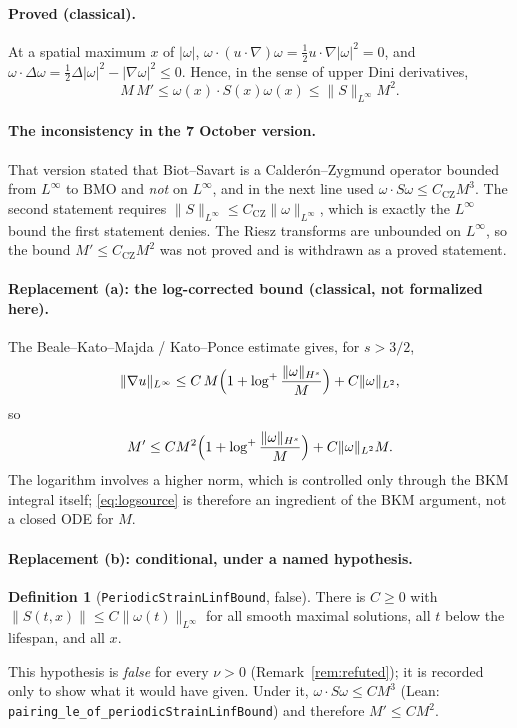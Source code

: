 \documentclass[11pt]{article}
\theoremstyle{definition}
\newtheorem{definition}{Definition}
\theoremstyle{remark}
\begin{document}
\paragraph{Proved (classical).} At a spatial maximum $x$ of $|\omega|$, $\omega\cdot(u\cdot\nabla)\omega=\tfrac12u\cdot\nabla|\omega|^2=0$, and $\omega\cdot\Delta\omega=\tfrac12\Delta|\omega|^2-|\nabla\omega|^2\le0$. Hence, in the sense of upper Dini derivatives,
\begin{equation}\label{eq:pairing}
M\,M'\le \omega(x)\cdot S(x)\omega(x)\le \|S\|_{L^\infty}M^2 .
\end{equation}

\paragraph{The inconsistency in the 7 October version.} That version stated that Biot--Savart is a Calder\'on--Zygmund operator bounded from $L^\infty$ to $\mathrm{BMO}$ and \emph{not} on $L^\infty$, and in the next line used $\omega\cdot S\omega\le C_{\mathrm{CZ}}M^3$. The second statement requires $\|S\|_{L^\infty}\le C_{\mathrm{CZ}}\|\omega\|_{L^\infty}$, which is exactly the $L^\infty$ bound the first statement denies. The Riesz transforms are unbounded on $L^\infty$, so the bound $M'\le C_{\mathrm{CZ}}M^2$ was not proved and is withdrawn as a proved statement.

\paragraph{Replacement (a): the log-corrected bound (classical, not formalized here).} The Beale--Kato--Majda / Kato--Ponce estimate gives, for $s>3/2$,
\[
\|\nabla u\|_{L^\infty}\le C\,M\Bigl(1+\log^+\frac{\|\omega\|_{H^s}}{M}\Bigr)+C\|\omega\|_{L^2},
\]
so
\begin{equation}\label{eq:logsource}
M'\le C M^2\Bigl(1+\log^+\frac{\|\omega\|_{H^s}}{M}\Bigr)+C\|\omega\|_{L^2}M .
\end{equation}
The logarithm involves a higher norm, which is controlled only through the BKM integral itself; \eqref{eq:logsource} is therefore an ingredient of the BKM argument, not a closed ODE for $M$.

\paragraph{Replacement (b): conditional, under a named hypothesis.}
\begin{definition}[\texttt{PeriodicStrainLinfBound}, false]
There is $C\ge0$ with $\|S(t,x)\|\le C\|\omega(t)\|_{L^\infty}$ for all smooth maximal solutions, all $t$ below the lifespan, and all $x$.
\end{definition}
This hypothesis is \emph{false} for every $\nu>0$ (Remark~\ref{rem:refuted}); it is recorded only to show what it would have given. Under it, $\omega\cdot S\omega\le CM^3$ (Lean: \texttt{pairing\_le\_of\_periodicStrainLinfBound}) and therefore $M'\le CM^2$.
\end{document}
